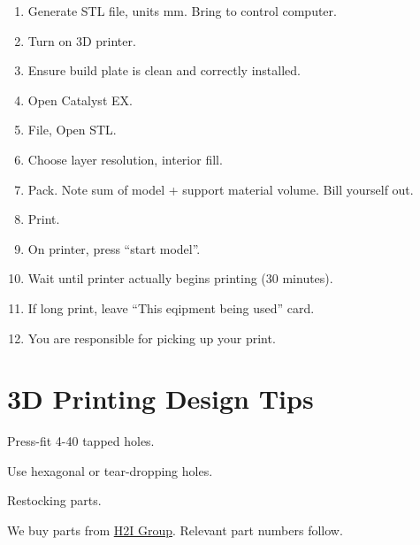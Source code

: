 \documentclass{training}
\begin{document}
\begin{enumerate}
    \item Generate STL file, units mm. Bring to control computer.
    \item Turn on 3D printer.
    \item Ensure build plate is clean and correctly installed.
    \item Open Catalyst EX.
    \item File, Open STL.
    \item Choose layer resolution, interior fill.
    \item Pack. Note sum of model + support material volume. Bill yourself out.
    \item Print.
    \item On printer, press ``start model''.
    \item Wait until printer actually begins printing (30 minutes).
    \item If long print, leave ``This eqipment being used'' card.
    \item You are responsible for picking up your print.
\end{enumerate}

\section{3D Printing Design Tips}

Press-fit 4-40 tapped holes.

Use hexagonal or tear-dropping holes.

\clearpage

Restocking parts.

We buy parts from \href{https://www.shop.h2igroup.com/}{H2I Group}.
Relevant part numbers follow.
\end{document}
